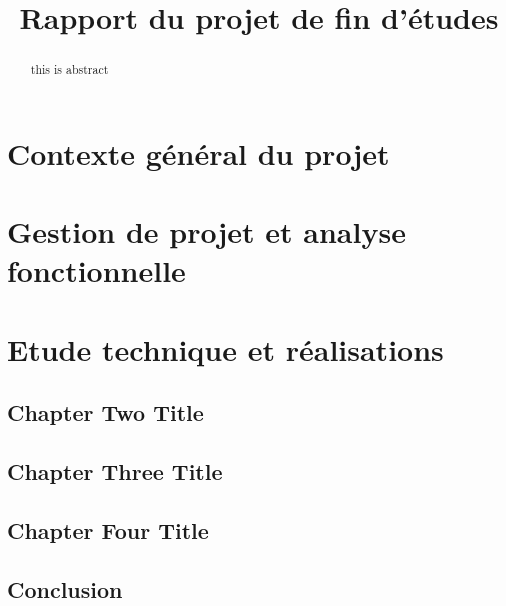 \documentclass[a4paper, french, 12pt]{report}
\title{Rapport du projet de fin d'études}\let\title\@title
\begin{document}
\begin{titlepage}
  
\end{titlepage}

\renewcommand{\abstractname}{Résumé}
\begin{abstract}
  
\end{abstract}

\renewcommand{\abstractname}{Abstract}
\begin{abstract}
  this is abstract
\end{abstract}

\tableofcontents
\part{Contexte général du projet}

\part{Gestion de projet et analyse fonctionnelle}
\part{Etude technique et réalisations}



\chapter{Chapter Two Title}


\chapter{Chapter Three Title}


\chapter{Chapter Four Title}


\chapter{Conclusion}

\end{document}
